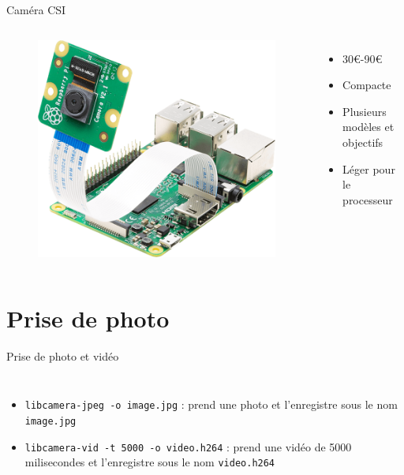 \documentclass[aspectratio=169,xcolor=dvipsnames]{beamer}
\begin{document}
\begin{frame}{Caméra CSI}
    \begin{columns}[c] %

        \begin{figure}
            \includegraphics[width=0.6\linewidth]{images/camera-csi.png}
        \end{figure}

        \begin{itemize}
            \item 30€-90€
            \item Compacte
            \item Plusieurs modèles et objectifs
            \item Léger pour le processeur
        \end{itemize}

    \end{columns}
\end{frame}


\section{Prise de photo}

\begin{frame}{Prise de photo et vidéo}
    \begin{columns}[c] %

        \begin{itemize}
            \item \texttt{libcamera-jpeg -o image.jpg} : prend une photo et l'enregistre sous le nom \texttt{image.jpg}
            \item \texttt{libcamera-vid -t 5000 -o video.h264} : prend une vidéo de 5000 milisecondes et l'enregistre sous le nom \texttt{video.h264}
        \end{itemize}

    \end{columns}
\end{frame}
\end{document}
